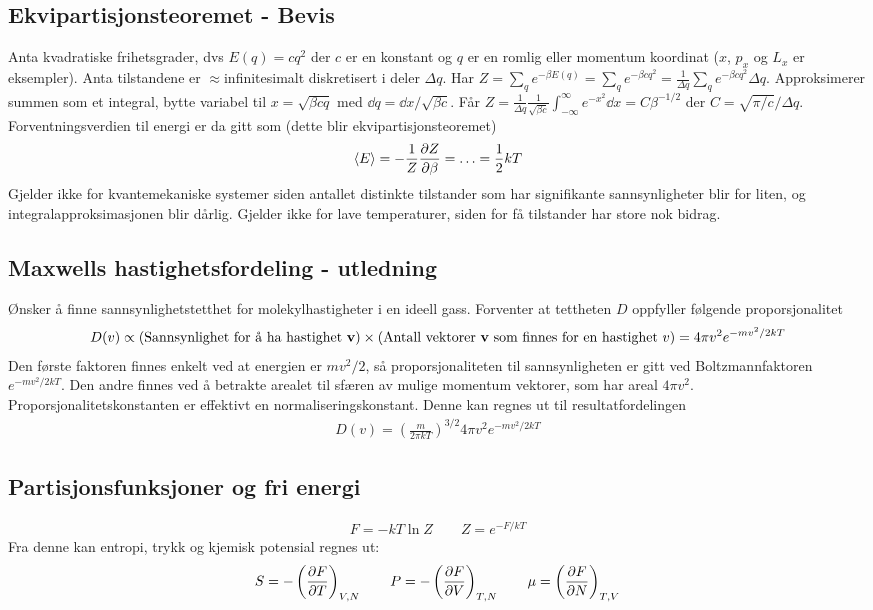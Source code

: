 \documentclass[12pt]{article}
\newcommand{\mean}[1]{\langle #1 \rangle}
\begin{document}
\subsection{Ekvipartisjonsteoremet - Bevis}
Anta kvadratiske frihetsgrader, dvs $E(q) = c q^2$ der $c$ er en konstant og $q$
er en romlig eller momentum koordinat ($x$, $p_x$ og $L_x$ er eksempler). Anta
tilstandene er $\approx$infinitesimalt diskretisert i deler $\Delta q$. Har
$Z = \sum_q e^{-\beta E(q)} = \sum_q e^{-\beta c q^2} = \frac{1}{\Delta q}\sum_q e^{-\beta c q^2}\Delta q$.
Approksimerer summen som et integral, bytte variabel til $x = \sqrt{\beta c q}$ med $\dd q = \dd x / \sqrt{\beta c}$.
Får $Z = \frac{1}{\Delta q} \frac{1}{\sqrt{\beta c}} \int_{-\infty}^{\infty} e^{-x^2} \dd x = C \beta^{-1/2}$ der $C = \sqrt{\pi/c}/\Delta q$.
Forventningsverdien til energi er da gitt som (dette blir ekvipartisjonsteoremet)
\begin{align*}
  \mean{E} = -\frac{1}{Z} \pdv{Z}{\beta} = \hdots = \frac{1}{2}kT
\end{align*}
Gjelder ikke for kvantemekaniske systemer siden antallet distinkte tilstander
som har signifikante sannsynligheter blir for liten, og integralapproksimasjonen
blir dårlig. Gjelder ikke for lave temperaturer, siden for få tilstander har
store nok bidrag.
\subsection{Maxwells hastighetsfordeling - utledning}
Ønsker å finne sannsynlighetstetthet for molekylhastigheter i en ideell gass. Forventer at
tettheten $D$ oppfyller følgende proporsjonalitet
\begin{align*}
  D(v) \propto (\text{Sannsynlighet for å ha hastighet } \vb v) \times (\text{Antall vektorer $\vb v$ som finnes for en hastighet $v$}) = 4\pi v^2 e^{-mv^2 / 2kT}
\end{align*}
Den første faktoren finnes enkelt ved at energien er $mv^2 / 2$, så proporsjonaliteten
til sannsynligheten er gitt ved Boltzmannfaktoren $e^{-mv^2 / 2kT}$. Den andre
finnes ved å betrakte arealet til sfæren av mulige momentum vektorer, som har areal
$4\pi v^2$. Proporsjonalitetskonstanten er effektivt en normaliseringskonstant. Denne kan regnes ut til resultatfordelingen
\begin{align*}
  D(v) = \left( \frac{m}{2\pi k T} \right)^{3/2} 4\pi v^2 e^{-mv^2 /2kT}
\end{align*}
\subsection{Partisjonsfunksjoner og fri energi}
\begin{align*}
  F = -kT \ln{Z} \qquad Z = e^{-F/kT}
\end{align*}
Fra denne kan entropi, trykk og kjemisk potensial regnes ut:
\begin{align*}
  S = -\left( \pdv{F}{T} \right)_{V,N} \qquad P = -\left( \pdv{F}{V} \right)_{T,N} \qquad \mu = \left( \pdv{F}{N} \right)_{T,V}
\end{align*}
\end{document}
